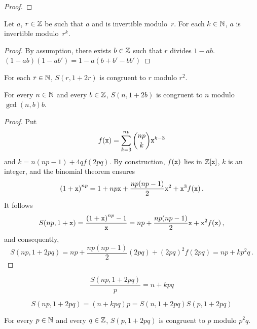 \begin{proof}
 
 
 
 \end{proof} 

 \begin{theorem}
   Let $a$, $r \in \mathbb{Z}$ be such that $a$ and is invertible modulo~$r$.
   For each $k \in \mathbb{N}$, $a$ is invertible modulo~$r^k$.
 \end{theorem}
 
 \begin{proof}
   By assumption, there exists $b \in \mathbb{Z}$ such that $r$ divides $1 - ab$.
      $(1 - ab)(1 - ab')  = 1 - a(b + b' - b b')$
 \end{proof}
 
 \begin{theorem} \label{thm:p-odd-pcarre}
   For each $r \in \mathbb{N}$,
   $S(r, 1 + 2r)$ is congruent to $r$ modulo $r^2$.
 \end{theorem}

 \begin{theorem} \label{thm:p-odd-pcarre}
   For every $n \in \mathbb{N}$ and every $b \in \mathbb{Z}$,
   $S(n, 1 + 2b)$ is congruent to $n$ modulo $\gcd(n, b) b$.
 \end{theorem}

\begin{proof}
   Put
   $$
   f(\mathtt{x}) = \sum_{k = 3}^{np} \binom{np}{k} \mathtt{x}^{k - 3} 
   $$
   and $k = n(np - 1) + 4 q f(2 p q)$.
   By construction, $f(\mathtt{x})$ lies in $\mathbb{Z}[\mathtt{x}]$, $k$ is an integer, and the binomial theorem ensures 
   $$
   {(1 + \mathtt{x})}^{np} = 1 + np \mathtt{x} + \frac{np(np - 1)}{2} \mathtt{x}^2 + \mathtt{x}^3 f(\mathtt{x}) \,.
   $$
   It follows
   $$
   S(np, 1 + \mathtt{x}) = \frac{{(1 + \mathtt{x})}^{np} - 1}{\mathtt{x}} = np + \frac{np(np - 1)}{2} \mathtt{x} + \mathtt{x}^2 f(\mathtt{x}) \,,
   $$
   and consequently,
   $$
   S(np, 1 + 2pq) = np + \frac{np(np - 1)}{2}(2pq) + {(2pq)}^2f(2pq) = np + kp^2q \,. 
   $$
 \end{proof}

   $$
   \frac{S(np, 1 + 2pq)}{p} = n + kpq
   $$

   $$
   S(np, 1 + 2pq) = (n + kpq) p = S(n, 1 + 2pq) S(p, 1 + 2pq) 
   $$
   
 \begin{theorem} \label{thm:p-odd-pcarre}
   For every $p \in \mathbb{N}$ and every $q \in \mathbb{Z}$,
   $S(p, 1 + 2pq)$ is congruent to $p$ modulo $p^2q$.
 \end{theorem}

